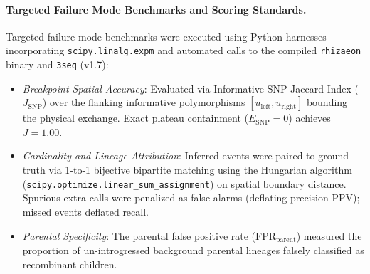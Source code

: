 \paragraph{Targeted Failure Mode Benchmarks and Scoring Standards.}
Targeted failure mode benchmarks were executed using Python harnesses incorporating \texttt{scipy.linalg.expm} and automated calls to the compiled \texttt{rhizaeon} binary and \texttt{3seq} (v1.7):
\begin{itemize}
    \item \textit{Breakpoint Spatial Accuracy}: Evaluated via Informative SNP Jaccard Index ($J_{\mathrm{SNP}}$) over the flanking informative polymorphisms $[u_{\mathrm{left}}, u_{\mathrm{right}}]$ bounding the physical exchange. Exact plateau containment ($E_{\mathrm{SNP}} = 0$) achieves $J = 1.00$.
    \item \textit{Cardinality and Lineage Attribution}: Inferred events were paired to ground truth via 1-to-1 bijective bipartite matching using the Hungarian algorithm (\texttt{scipy.optimize.linear\_sum\_assignment}) on spatial boundary distance. Spurious extra calls were penalized as false alarms (deflating precision $\text{PPV}$); missed events deflated recall.
    \item \textit{Parental Specificity}: The parental false positive rate ($\text{FPR}_{\mathrm{parent}}$) measured the proportion of un-introgressed background parental lineages falsely classified as recombinant children.
\end{itemize}
